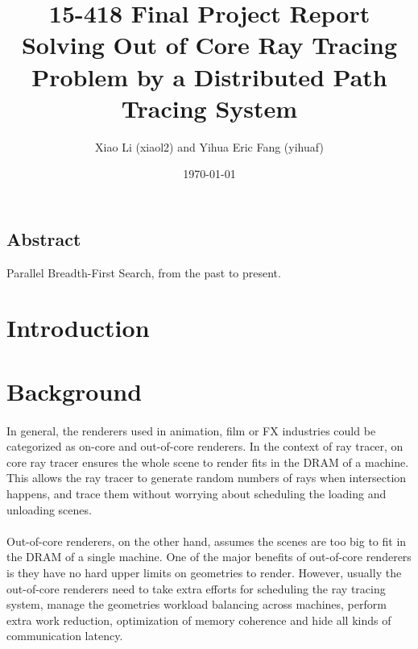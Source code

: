 \documentclass[a4paper, oneside, 10pt]{article}
\title{{\bf 15-418 Final Project Report \\
 \large Solving Out of Core Ray Tracing Problem by a Distributed Path Tracing System}} %
\author{Xiao Li (xiaol2) and Yihua Eric Fang (yihuaf)}
\date{\today} %
\begin{document}
\maketitle
\thispagestyle{empty}
\newpage
\begin{center}
\vspace*{\fill}
\section*{Abstract}
Parallel Breadth-First Search, from the past to present.\\
\vspace*{\fill}
\newpage
\end{center}

\tableofcontents
\newpage

\section{Introduction}
\section{Background}
\paragraph{} In general, the renderers used in animation, film or FX industries could be categorized as on-core and out-of-core renderers.  In the context of ray tracer, on core ray tracer ensures the whole scene to render fits in the DRAM of a machine. This allows the ray tracer to generate random numbers of rays when intersection happens, and trace them without worrying about scheduling the loading and unloading scenes. 

\paragraph{} Out-of-core renderers, on the other hand, assumes the scenes are too big to fit in the DRAM of a single machine. One of the major benefits of out-of-core renderers is they have no hard upper limits on geometries to render. However, usually the out-of-core renderers need to take extra efforts for scheduling the ray tracing system, manage the geometries workload balancing across machines, perform extra work reduction, optimization of memory coherence and hide all kinds of communication latency. 
\end{document}
